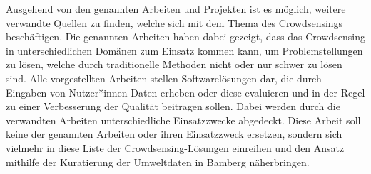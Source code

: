 Ausgehend von den genannten Arbeiten und Projekten ist es möglich, weitere verwandte Quellen zu finden, welche sich mit dem Thema des Crowdsensings beschäftigen. Die genannten Arbeiten haben dabei gezeigt, dass das Crowdsensing in unterschiedlichen Domänen zum Einsatz kommen kann, um Problemstellungen zu lösen, welche durch traditionelle Methoden nicht oder nur schwer zu lösen sind. Alle vorgestellten Arbeiten stellen Softwarelösungen dar, die durch Eingaben von Nutzer*innen Daten erheben oder diese evaluieren und in der Regel zu einer Verbesserung der Qualität beitragen sollen. Dabei werden durch die verwandten Arbeiten unterschiedliche Einsatzzwecke abgedeckt. Diese Arbeit soll keine der genannten Arbeiten oder ihren Einsatzzweck ersetzen, sondern sich vielmehr in diese Liste der Crowdsensing-Lösungen einreihen und den Ansatz mithilfe der Kuratierung der Umweltdaten in Bamberg näherbringen.